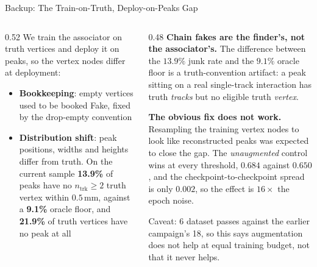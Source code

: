 \documentclass[xcolor=table,aspectratio=169]{beamer}
\newcommand{\ntrk}{\ensuremath{n_\mathrm{trk}}}
\begin{document}
\begin{frame}{Backup: The Train-on-Truth, Deploy-on-Peaks Gap}
    \small
    \begin{columns}[t]
        \begin{column}{0.52\linewidth}
            We train the associator on truth vertices and deploy it on peaks, so the
            vertex nodes differ at deployment:
            \begin{itemize}
                \setlength\itemsep{0.35em}
                \item \textbf{Bookkeeping}: empty vertices used to be booked Fake,
                    fixed by the drop-empty convention
                \item \textbf{Distribution shift}: peak positions, widths and heights
                    differ from truth. On the current sample \textbf{13.9\%} of peaks
                    have no $\ntrk\geq2$ truth vertex within $0.5$\,mm, against a
                    \textbf{9.1\%} oracle floor, and \textbf{21.9\%} of truth vertices
                    have no peak at all
            \end{itemize}
        \end{column}
        \begin{column}{0.48\linewidth}
            \textbf{Chain fakes are the finder's, not the associator's.} The difference
            between the $13.9\%$ junk rate and the $9.1\%$ oracle floor is a
            truth-convention artifact: a peak sitting on a real single-track interaction
            has truth \emph{tracks} but no eligible truth \emph{vertex}.
            \vspace{0.6em}

            \vspace{0.2em}
            \textbf{The obvious fix does not work.} Resampling the training vertex nodes
            to look like reconstructed peaks was expected to close the gap. The
            \emph{unaugmented} control wins at every threshold, $0.684$ against $0.650$,
            and the checkpoint-to-checkpoint spread is only $0.002$, so the effect is
            $16\times$ the epoch noise.
            \vspace{0.5em}

            {\footnotesize\textcolor{black!55}{Caveat: 6 dataset passes against the
            earlier campaign's 18, so this says augmentation does not help at equal
            training budget, not that it never helps.}}
        \end{column}
    \end{columns}
\end{frame}
\end{document}
